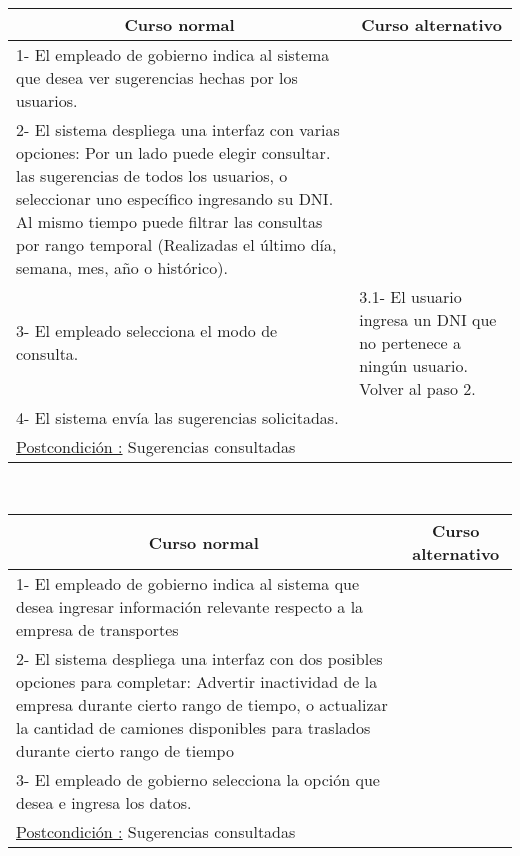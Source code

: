 ~


\begin{center}
    \centering
    \begin{tabular}{ | p{11cm} | p{6cm} | }
    	\multicolumn{1}{c}{\cellcolor{black!30}\textbf{Curso normal}} & 
    	\multicolumn{1}{c}{\cellcolor{black!30}\textbf{Curso alternativo}} \\ \hline
    	1- El empleado de gobierno indica al sistema que desea ver sugerencias hechas por los usuarios. & \\ \hline
    	2- El sistema despliega una interfaz con varias opciones: Por un lado puede elegir consultar. 
    	las sugerencias de todos los usuarios, o seleccionar uno específico ingresando su DNI. Al mismo
    	tiempo puede filtrar las consultas por rango temporal (Realizadas el último día, semana, mes, año
    	o histórico). & \\ \hline
    	3- El empleado selecciona el modo de consulta. & 3.1- El usuario ingresa un DNI que no pertenece a ningún usuario. Volver al paso 2. \\ \hline
    	4- El sistema envía las sugerencias solicitadas. & \\ \hline
	\underline{Postcondición :} Sugerencias consultadas & \\ \hline
    \end{tabular}
\end{center}

~


\begin{center}
    \centering
    \begin{tabular}{ | p{11cm} | p{6cm} | }
    	\multicolumn{1}{c}{\cellcolor{black!30}\textbf{Curso normal}} & 
    	\multicolumn{1}{c}{\cellcolor{black!30}\textbf{Curso alternativo}} \\ \hline
    	1- El empleado de gobierno indica al sistema que desea ingresar información relevante respecto a la empresa de transportes & \\ \hline
    	2- El sistema despliega una interfaz con dos posibles opciones para completar: Advertir inactividad de la empresa durante cierto rango de tiempo,
    	o actualizar la cantidad de camiones disponibles para traslados durante cierto rango de tiempo & \\ \hline
    	3- El empleado de gobierno selecciona la opción que desea e ingresa los datos. & \\ \hline
	\underline{Postcondición :} Sugerencias consultadas & \\ \hline
    \end{tabular}
\end{center}


